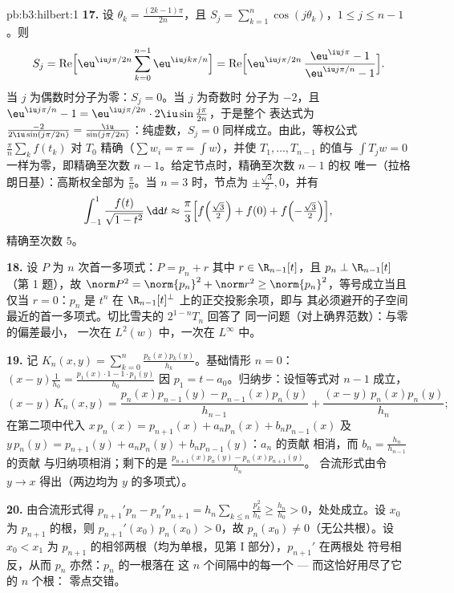 \begin{solution}{pb:b3:hilbert:1}
\textbf{17.} 设 $\theta_k = \frac{(2k-1)\pi}{2n}$，且 $S_j
= \sum_{k=1}^n\cos(j\theta_k)$，$1 \leq j \leq n-1$。则
\[
S_j = \operatorname{Re}\Bigl[\eu^{\iu j\pi/2n}
\sum_{k=0}^{n-1}\eu^{\iu jk\pi/n}\Bigr]
= \operatorname{Re}\Bigl[\eu^{\iu j\pi/2n}\,
\frac{\eu^{\iu j\pi} - 1}{\eu^{\iu j\pi/n} - 1}\Bigr] .
\]
当 $j$ 为偶数时分子为零：$S_j = 0$。当 $j$ 为奇数时
分子为 $-2$，且 $\eu^{\iu j\pi/n} - 1 =
\eu^{\iu j\pi/2n}\cdot2\iu\sin\frac{j\pi}{2n}$，于是整个
表达式为 $\frac{-2}{2\iu\sin(j\pi/2n)} =
\frac{\iu}{\sin(j\pi/2n)}$：纯虚数，$S_j = 0$
同样成立。由此，等权公式 $\frac\pi n\sum_kf(t_k)$
对 $T_0$ 精确（$\sum w_i = \pi = \int w$），并使 $T_1,
\dots, T_{n-1}$ 的值与 $\int T_jw = 0$ 一样为零，即精确至次数
$n - 1$。给定节点时，精确至次数 $n-1$ 的权
唯一（拉格朗日基）：高斯权全部为
$\frac\pi n$。当 $n = 3$ 时，节点为 $\pm\frac{\sqrt3}2, 0$，并有
\[
\int_{-1}^1\frac{f(t)}{\sqrt{1 - t^2}}\,\dd t \approx
\frac\pi3\Bigl[f\Bigl(\tfrac{\sqrt3}2\Bigr) + f(0) +
f\Bigl(-\tfrac{\sqrt3}2\Bigr)\Bigr],
\]
精确至次数 $5$。

\textbf{18.} 设 $P$ 为 $n$ 次首一多项式：$P = p_n + r$
其中 $r \in \R_{n-1}[t]$，且 $p_n \perp \R_{n-1}[t]$
（第 1 题），故 $\norm P^2 = \norm{p_n}^2 + \norm r^2 \geq
\norm{p_n}^2$，等号成立当且仅当 $r = 0$：$p_n$ 是
$t^n$ 在
$\R_{n-1}[t]^\perp$ 上的正交投影余项，即与
其必须避开的子空间最近的首一多项式。切比雪夫的 $2^{1-n}T_n$ 回答了
同一问题（对上确界范数）：与零的偏差最小，
一次在 $L^2(w)$ 中，一次在 $L^\infty$ 中。

\textbf{19.} 记 $K_n(x, y) =
\sum_{k=0}^n\frac{p_k(x)p_k(y)}{h_k}$。基础情形 $n = 0$：$(x -
y)\frac1{h_0} = \frac{p_1(x)\cdot1 - 1\cdot p_1(y)}{h_0}$
因 $p_1 = t - a_0$。归纳步：设恒等式对 $n -
1$ 成立，
\[
(x - y)\,K_n(x,y) = \frac{p_n(x)p_{n-1}(y) -
p_{n-1}(x)p_n(y)}{h_{n-1}} +
\frac{(x - y)\,p_n(x)p_n(y)}{h_n} ;
\]
在第二项中代入 $x\,p_n(x) = p_{n+1}(x) + a_np_n(x) +
b_np_{n-1}(x)$ 及 $y\,p_n(y) = p_{n+1}(y) + a_np_n(y) +
b_np_{n-1}(y)$：$a_n$ 的贡献
相消，而 $b_n = \frac{h_n}{h_{n-1}}$ 的贡献
与归纳项相消；剩下的是
$\frac{p_{n+1}(x)p_n(y) - p_n(x)p_{n+1}(y)}{h_n}$。
合流形式由令 $y \to x$ 得出（两边均为
$y$ 的多项式）。

\textbf{20.} 由合流形式得 $p_{n+1}'p_n -
p_n'p_{n+1} = h_n\sum_{k\leq n}\frac{p_k^2}{h_k} \geq
\frac{h_n}{h_0} > 0$，处处成立。设 $x_0$ 为
$p_{n+1}$ 的根，则 $p_{n+1}'(x_0)\,p_n(x_0) > 0$，故 $p_n(x_0) \neq
0$（无公共根）。设 $x_0 < x_1$ 为
$p_{n+1}$ 的相邻两根（均为单根，见第 I 部分），$p_{n+1}'$ 在两根处
符号相反，从而 $p_n$ 亦然：$p_n$ 的一根落在
这 $n$ 个间隔中的每一个 --- 而这恰好用尽了它的 $n$ 个根：
零点交错。


\end{solution}
